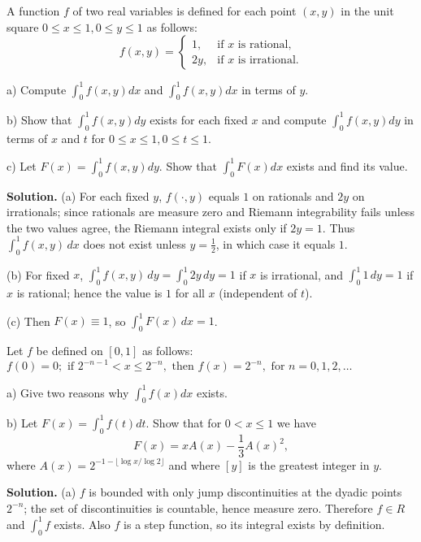 \begin{problembox}
A function $f$ of two real variables is defined for each point $(x, y)$ in the unit square $0 \leq x \leq 1, 0 \leq y \leq 1$ as follows:
\[f(x, y) = 
\begin{cases}
1, & \text{if } x \text{ is rational}, \\
2y, & \text{if } x \text{ is irrational}.
\end{cases}\]

a) Compute $\int_{0}^{1} f(x, y) dx$ and $\int_{0}^{1} f(x, y) dx$ in terms of $y$.

b) Show that $\int_{0}^{1} f(x, y) dy$ exists for each fixed $x$ and compute $\int_{0}^{1} f(x, y) dy$ in terms of $x$ and $t$ for $0 \leq x \leq 1, 0 \leq t \leq 1$.

c) Let $F(x) = \int_{0}^{1} f(x, y) dy$. Show that $\int_{0}^{1} F(x) dx$ exists and find its value.
\end{problembox}

\noindent\textbf{Solution.}
(a) For each fixed $y$, $f(\cdot,y)$ equals $1$ on rationals and $2y$ on irrationals; since rationals are measure zero and Riemann integrability fails unless the two values agree, the Riemann integral exists only if $2y=1$. Thus $\int_0^1 f(x,y)\,dx$ does not exist unless $y=\tfrac12$, in which case it equals $1$.

(b) For fixed $x$, $\int_0^1 f(x,y)\,dy=\int_0^1 2y\,dy=1$ if $x$ is irrational, and $\int_0^1 1\,dy=1$ if $x$ is rational; hence the value is $1$ for all $x$ (independent of $t$).

(c) Then $F(x)\equiv 1$, so $\int_0^1 F(x)\,dx=1$.
\medskip

\begin{problembox}
Let $f$ be defined on $[0, 1]$ as follows: $f(0) = 0; \text{ if } 2^{-n-1} < x \leq 2^{-n}, \text{ then } f(x) = 2^{-n}, \text{ for } n = 0, 1, 2, \ldots$

a) Give two reasons why $\int_{0}^{1} f(x) dx$ exists.

b) Let $F(x) = \int_{0}^{1} f(t) dt$. Show that for $0 < x \leq 1$ we have
\[F(x) = xA(x) - \frac{1}{3} A(x)^{2},\]
where $A(x) = 2^{-1-\lfloor \log x / \log 2 \rfloor}$ and where $[y]$ is the greatest integer in $y$.
\end{problembox}

\noindent\textbf{Solution.}
(a) $f$ is bounded with only jump discontinuities at the dyadic points $2^{-n}$; the set of discontinuities is countable, hence measure zero. Therefore $f\in R$ and $\int_0^1 f$ exists. Also $f$ is a step function, so its integral exists by definition.


